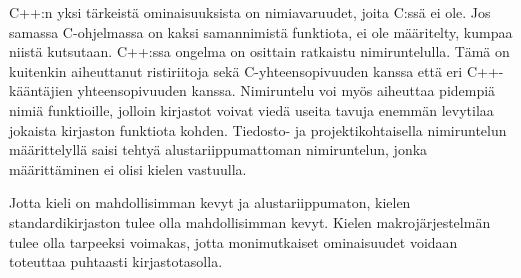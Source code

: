 
C++:n yksi tärkeistä ominaisuuksista on nimiavaruudet, joita C:ssä ei ole. Jos
samassa C-ohjelmassa on kaksi samannimistä funktiota, ei ole määritelty, kumpaa
niistä kutsutaan. C++:ssa ongelma on osittain ratkaistu nimiruntelulla. Tämä on
kuitenkin aiheuttanut ristiriitoja sekä C-yhteensopivuuden kanssa että eri
C++-kääntäjien yhteensopivuuden kanssa. Nimiruntelu voi myös aiheuttaa pidempiä
nimiä funktioille, jolloin kirjastot voivat viedä useita tavuja enemmän
levytilaa jokaista kirjaston funktiota kohden. Tiedosto- ja projektikohtaisella
nimiruntelun määrittelyllä saisi tehtyä alustariippumattoman nimiruntelun,
jonka määrittäminen ei olisi kielen vastuulla.

Jotta kieli on mahdollisimman kevyt ja alustariippumaton, kielen
standardikirjaston tulee olla mahdollisimman kevyt. Kielen makrojärjestelmän
tulee olla tarpeeksi voimakas, jotta monimutkaiset ominaisuudet voidaan
toteuttaa puhtaasti kirjastotasolla.

%
%
%

